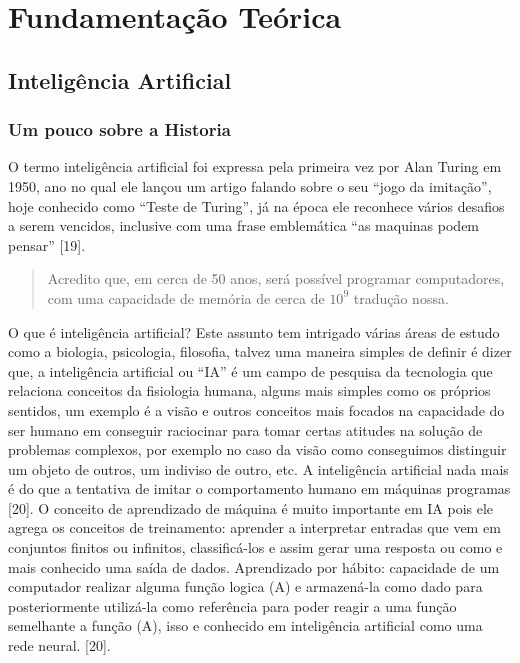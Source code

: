 \chapter{Fundamentação Teórica}\label{cap:fundTeo}

\section{Inteligência Artificial}

\subsection{Um pouco sobre a Historia}
O termo inteligência artificial foi expressa pela primeira vez por Alan Turing em 1950, ano no qual ele lançou um artigo falando sobre o seu “jogo da imitação”, hoje conhecido como “Teste de Turing”, já na época ele reconhece vários desafios a serem vencidos, inclusive com uma frase emblemática “as maquinas podem pensar” [19].
 \begin{quotation}
    \footnotesize Acredito que, em cerca de 50 anos, será possível programar computadores, com uma capacidade de memória de cerca de \(10^9\) \cite{alanT} tradução nossa.
 \end{quotation}
O que é inteligência artificial? Este assunto tem intrigado várias áreas de estudo como a biologia, psicologia, filosofia, talvez uma maneira simples de definir é dizer que, a  inteligência artificial ou “IA” é um campo de pesquisa da tecnologia que relaciona conceitos da fisiologia humana, alguns mais simples como os próprios sentidos,  um exemplo é a visão e outros conceitos mais focados na capacidade do ser humano em conseguir raciocinar para tomar certas atitudes na solução de problemas complexos, por exemplo no caso da visão como conseguimos distinguir um objeto de outros, um indiviso de outro, etc. A inteligência artificial nada mais é do que a tentativa de imitar o comportamento humano em máquinas programas [20].
O conceito de aprendizado de máquina é muito importante em IA pois ele agrega os conceitos de treinamento: aprender a interpretar entradas que vem em conjuntos finitos ou infinitos, classificá-los e assim gerar uma resposta ou como e mais conhecido uma saída de dados. Aprendizado por hábito: capacidade de um computador realizar alguma função logica (A) e armazená-la como dado para posteriormente utilizá-la como referência para poder reagir a uma função semelhante a função (A), isso e conhecido em inteligência artificial como uma rede neural.  [20].

